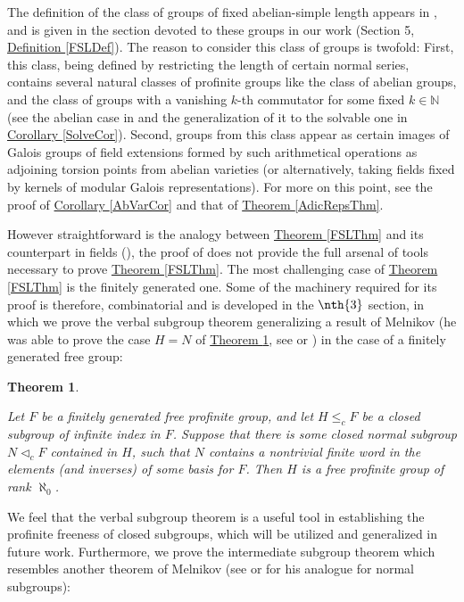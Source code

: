 \documentclass[12pt,a4paper]{article}
\newtheorem{theorem}{Theorem}[section]
\newcommand{\thmref}[1]{\hyperref[#1]{Theorem \ref*{#1}}}
\newcommand{\corref}[1]{\hyperref[#1]{Corollary \ref*{#1}}}
\newcommand{\defref}[1]{\hyperref[#1]{Definition \ref*{#1}}}
\begin{document}
The definition of the class of groups of fixed abelian-simple length appears in \cite[Section 2]{BFW}, and is given in the section devoted to these groups in our work (Section 5, \defref{FSLDef}). The reason to consider this class of groups is twofold: First, this class, being defined by restricting the length of certain normal series, contains several natural classes of profinite groups like the class of abelian groups, and the class of groups with a vanishing $k$-th commutator for some fixed $k \in \mathbb{N}$ (see the abelian case in \cite[Corollary 25.4.8]{FJ} and the generalization of it to the solvable one in \corref{SolveCor}). Second, groups from this class appear as certain images of Galois groups of field extensions formed by such arithmetical operations as adjoining torsion points from abelian varieties (or alternatively, taking fields fixed by kernels of modular Galois representations). For more on this point, see the proof of \corref{AbVarCor} and that of \thmref{AdicRepsThm}.

However straightforward is the analogy between \thmref{FSLThm} and its counterpart in fields (\cite[Theorem 3.2]{BFW}), the proof of \cite[Theorem 3.2]{BFW} does not provide the full arsenal of tools necessary to prove \thmref{FSLThm}. The most challenging case of \thmref{FSLThm} is the finitely generated one. Some of the machinery required for its proof is therefore, combinatorial and is developed in the $\nth{3}$ section, in which we prove the verbal subgroup theorem generalizing a result of Melnikov (he was able to prove the case $H = N$ of \thmref{FreeVerbalSubgroupThm}, see \cite[Theorem 8.9.1]{RZ} or \cite[Proposition 25.8.1]{FJ}) in the case of a finitely generated free group:

\begin{theorem} \label{FreeVerbalSubgroupThm}

Let $F$ be a finitely generated free profinite group, and let $H \leq_c F$ be a closed subgroup of infinite index in $F$. Suppose that there is some closed normal subgroup $N \lhd_c F$ contained in $H$, such that $N$ contains a nontrivial finite word in the elements (and inverses) of some basis for $F$. Then $H$ is a free profinite group of rank $\aleph_0$.

\end{theorem}     

We feel that the verbal subgroup theorem is a useful tool in establishing the profinite freeness of closed subgroups, which will be utilized and generalized in future work. Furthermore, we prove the intermediate subgroup theorem which resembles another theorem of Melnikov (see \cite[Theorem 8.9.9]{RZ} or \cite[Proposition 25.8.3]{FJ} for his analogue for normal subgroups):
\end{document}
